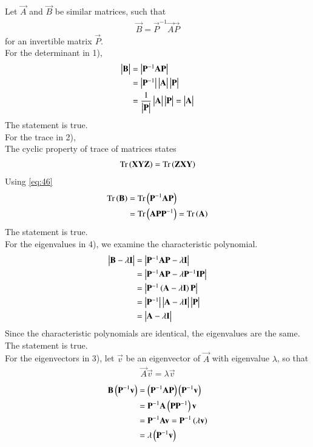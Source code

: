 \documentclass[journal]{IEEEtran}
\begin{document}
Let $\vec{A}$ and $\vec{B}$ be similar matrices, such that 
\begin{align} 
    \vec{B} = \vec{P}^{-1}\vec{A}\vec{P}
\end{align}
for an invertible matrix $\vec{P}$. \\
For the determinant in 1),
\begin{align}
    \begin{vmatrix}\mathbf{B}\end{vmatrix} &= \begin{vmatrix}\mathbf{P}^{-1}\mathbf{A}\mathbf{P}\end{vmatrix} \\
    &= \begin{vmatrix}\mathbf{P}^{-1}\end{vmatrix}\begin{vmatrix}\mathbf{A}\end{vmatrix}\begin{vmatrix}\mathbf{P}\end{vmatrix} \\
    &= \frac{1}{\begin{vmatrix}\mathbf{P}\end{vmatrix}}\begin{vmatrix}\mathbf{A}\end{vmatrix}\begin{vmatrix}\mathbf{P}\end{vmatrix} = \begin{vmatrix}\mathbf{A}\end{vmatrix}
\end{align}
The statement is true. \\
For the trace in 2), \\
The cyclic property of trace of matrices states 
\begin{align}
    \text{Tr}\left(\mathbf{X}\mathbf{Y}\mathbf{Z}\right) = \text{Tr}\left(\mathbf{Z}\mathbf{X}\mathbf{Y}\right) \label{eq:46}
\end{align}
Using \eqref{eq:46}
\begin{align}
    \text{Tr}\left(\mathbf{B}\right) &= \text{Tr}\left(\mathbf{P}^{-1}\mathbf{A}\mathbf{P}\right) \\
    &= \text{Tr}\left(\mathbf{A}\mathbf{P}\mathbf{P}^{-1}\right) = \text{Tr}\left(\mathbf{A}\right)
\end{align}
The statement is true. \\
For the eigenvalues in 4), we examine the characteristic polynomial.
\begin{align}
    \begin{vmatrix}\mathbf{B} - \lambda\mathbf{I}\end{vmatrix} &= \begin{vmatrix}\mathbf{P}^{-1}\mathbf{A}\mathbf{P} - \lambda\mathbf{I}\end{vmatrix} \\
    &= \begin{vmatrix}\mathbf{P}^{-1}\mathbf{A}\mathbf{P} - \lambda\mathbf{P}^{-1}\mathbf{I}\mathbf{P}\end{vmatrix} \\
    &= \begin{vmatrix}\mathbf{P}^{-1}\left(\mathbf{A} - \lambda\mathbf{I}\right)\mathbf{P}\end{vmatrix} \\
    &= \begin{vmatrix}\mathbf{P}^{-1}\end{vmatrix}\begin{vmatrix}\mathbf{A} - \lambda\mathbf{I}\end{vmatrix}\begin{vmatrix}\mathbf{P}\end{vmatrix} \\
    &= \begin{vmatrix}\mathbf{A} - \lambda\mathbf{I}\end{vmatrix}
\end{align}
Since the characteristic polynomials are identical, the eigenvalues are the same. The statement is true. \\
For the eigenvectors in 3), let $\vec{v}$ be an eigenvector of $\vec{A}$ with eigenvalue $\lambda$, so that
\begin{align}
    \vec{A}\vec{v} = \lambda\vec{v}
\end{align}
\begin{align}
    \mathbf{B}\left(\mathbf{P}^{-1}\mathbf{v}\right) &= \left(\mathbf{P}^{-1}\mathbf{A}\mathbf{P}\right)\left(\mathbf{P}^{-1}\mathbf{v}\right) \\
    &= \mathbf{P}^{-1}\mathbf{A}\left(\mathbf{P}\mathbf{P}^{-1}\right)\mathbf{v} \\
    &= \mathbf{P}^{-1}\mathbf{A}\mathbf{v} = \mathbf{P}^{-1}\left(\lambda\mathbf{v}\right) \\
    &= \lambda\left(\mathbf{P}^{-1}\mathbf{v}\right)
\end{align}
\end{document}
